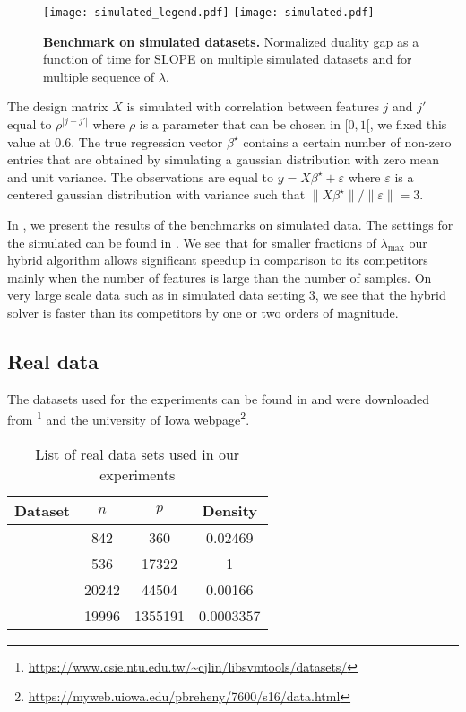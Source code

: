 \begin{figure*}[!t]
  \centering
  \texttt{[image: simulated\_legend.pdf]}
  \texttt{[image: simulated.pdf]}
  \caption{\textbf{Benchmark on simulated datasets.} Normalized duality gap as a function of time for SLOPE on multiple simulated datasets and for multiple sequence of $\lambda$.}
  \label{fig:simulated}
\end{figure*}

The design matrix $X$ is simulated with correlation between features $j$ and $j'$ equal to $\rho^{|j-j'|}$ where $\rho$ is a parameter that can be chosen in $[0, 1[$, we fixed this value at $0.6$.
The true regression vector $\beta^\star$ contains a certain number of non-zero entries that are obtained by simulating a gaussian distribution with zero mean and unit variance.
The observations are equal to $y=X\beta^\star + \varepsilon$ where $\varepsilon$ is a centered gaussian distribution with variance such that $\lVert X\beta^\star\rVert / \lVert \varepsilon \rVert = 3$.

In , we present the results of the benchmarks on simulated data.
The settings for the simulated can be found in .
We see that for smaller fractions of $\lambda_{\text{max}}$ our hybrid algorithm allows significant speedup in comparison to its competitors mainly when the number of features is large than the number of samples.
On very large scale data such as in simulated data setting $3$, we see that the hybrid solver is faster than its competitors by one or two orders of magnitude.

\subsection{Real data}
\label{sec:experiments-real-data}

The datasets used for the experiments can be found in  and were downloaded from \footnote{\url{https://www.csie.ntu.edu.tw/~cjlin/libsvmtools/datasets/}} and the university of Iowa webpage\footnote{\url{https://myweb.uiowa.edu/pbreheny/7600/s16/data.html}}.

\begin{table}[hbt]
  \centering
  \caption{List of real data sets used in our experiments}
  \label{tab:real-data}
  \begin{tabular}{
      l
      S[table-format=5.0,round-mode=off]
      S[table-format=7.0,round-mode=off]
      S[table-format=1.5,round-mode=figures,round-precision=2]
    }
    \toprule
    Dataset            & \(n\) & \(p\)   & {Density} \\ \midrule
     & 842   & 360     & 0.02469   \\
       & 536   & 17322   & 1         \\
         & 20242 & 44504   & 0.00166   \\
       & 19996 & 1355191 & 0.0003357 \\ \bottomrule
  \end{tabular}
\end{table}

